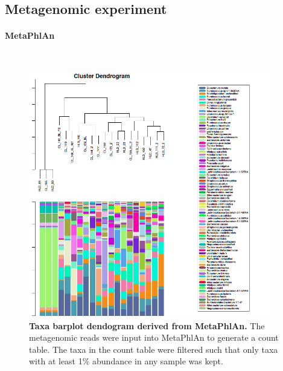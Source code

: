 \subsection{Metagenomic experiment}

\paragraph{MetaPhlAn}\mbox{}\\

\begin{figure}[h]
\begin{center}
\includegraphics[width=0.95\textwidth]{metaphlan_barplot_dendogram.png}
\caption{\textbf{Taxa barplot dendogram derived from MetaPhlAn.} The metagenomic reads were input into MetaPhlAn to generate a count table. The taxa in the count table were filtered such that only taxa with at least 1\% abundance in any sample was kept.}
\end{center}
\label{nafld_metaphlan_barplot}
\end{figure}

